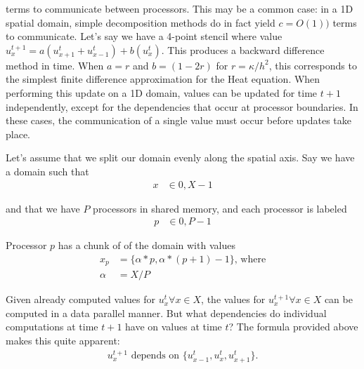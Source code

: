 terms to communicate between processors. This may be a common case: in a 1D
spatial domain, simple decomposition methods do in fact yield $c = O(1))$ terms
to communicate. Let's say we have a 4-point stencil where value $u^{t+1}_x =
a(u^{t}_{x+1} + u^{t}_{x-1}) + b(u^{t}_{x})$. This produces a backward difference
method in time. When $a = r$ and $b = (1-2r)$ for $r = \kappa / h^2$, this
corresponds to the simplest finite difference approximation for the Heat
equation. When performing this update on a 1D domain, values can be updated for
time $t+1$ independently, except for the dependencies that occur at processor
boundaries. In these cases, the communication of a single value must occur
before updates take place.

Let's assume that we split our domain evenly along the spatial axis. Say we have
a domain such that
\begin{align*}
    x &\in {0, X-1} 
\end{align*}

and that we have $P$ processors in shared memory, and each processor is labeled
\begin{align*}
    p &\in {0, P-1}
\end{align*}

Processor $p$ has a chunk of of the domain with values 
\begin{align*}
    x_p     &= \{\alpha*p, \alpha*(p+1)-1\} \text{, where} \\
    \alpha  &= X / P 
\end{align*}

Given already computed values for $u^{t}_{x} \forall x \in X$, the values for
$u^{t+1}_{x} \forall x \in X$ can be computed in a data parallel manner. But
what dependencies do individual computations at time $t+1$ have on values at
time $t$? The formula provided above makes this quite apparent:
\begin{align*}
    u^{t+1}_{x} \text{ depends on } \{ u^{t}_{x-1}, u^{t}_{x}, u^{t}_{x+1} \}
    \text{.}
\end{align*}

